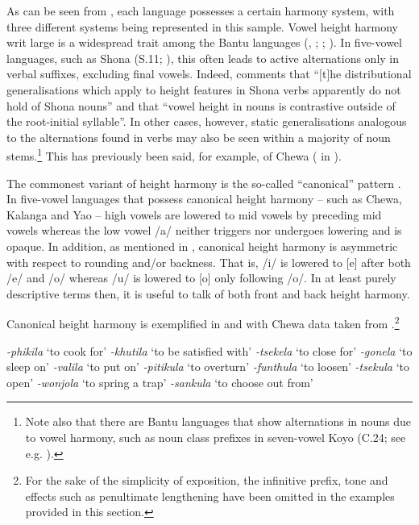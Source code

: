 \documentclass[output=paper]{langscibook}
\begin{document}
As can be seen from , each language possesses a certain harmony system, with three different systems being represented in this sample. Vowel height harmony writ large is a widespread trait among the Bantu languages (\citealt[236]{Hyman99}, \citeyear[46--47]{Hyman03}; \citealt[7]{Nurse03a}; \citealt[\S{1}]{Odden15}). In five-vowel languages, such as Shona (S.11; \citealt{Beckman97}), this often leads to active alternations only in verbal suffixes, excluding final vowels. Indeed, \citet[38]{Beckman97} comments that ``[t]he distributional generalisations which apply to height features in Shona verbs apparently do not hold of Shona nouns'' and that ``vowel height in nouns is contrastive outside of the root-initial syllable''. In other cases, however, static generalisations analogous to the alternations found in verbs may also be seen within a majority of noun stems.\footnote{Note also that there are Bantu languages that show alternations in nouns due to vowel harmony, such as noun class prefixes in seven-vowel Koyo (C.24; see e.g. \citealt[240]{Hyman99}).} This has previously been said, for example, of Chewa (\citealt{Scullen92} in \citealt[75]{Downing17}).

The commonest variant of height harmony is the so-called ``canonical'' pattern \citep[after][238]{Hyman99}. In five-vowel languages that possess canonical height harmony -- such as Chewa, Kalanga and Yao -- high vowels are lowered to mid vowels by preceding mid vowels whereas the low vowel /a/ neither triggers nor undergoes lowering and is opaque. In addition, as mentioned in , canonical height harmony is asymmetric with respect to rounding and/or backness. That is, /i/ is lowered to [e] after both /e/ and /o/ whereas /u/ is lowered to [o] only following /o/. In at least purely descriptive terms then, it is useful to talk of both front and back height harmony.

Canonical height harmony is exemplified in  and  with Chewa data taken from \citet[71--72]{Downing17}.\footnote{For the sake of the simplicity of exposition, the infinitive prefix, tone and effects such as penultimate lengthening have been omitted in the examples provided in this section.}

\begin{multicols}{2}
\ea \label{ex:nichols:chewa-f}
\ea \textit{-phikila} `to cook for'
\ex \textit{-khutila} `to be satisfied with'
\ex \textit{-tsekela} `to close for'
\ex \textit{-gonela} `to sleep on'
\ex \textit{-valila} `to put on'
\z
%
\ex \label{ex:nichols:chewa-b}
\ea \textit{-pitikula} `to overturn'
\ex \textit{-funthula} `to loosen'
\ex \textit{-tsekula} `to open'
\ex \textit{-wonjola} `to spring a trap'
\ex \textit{-sankula} `to choose out from'
\z
\z
\end{multicols}
\end{document}

